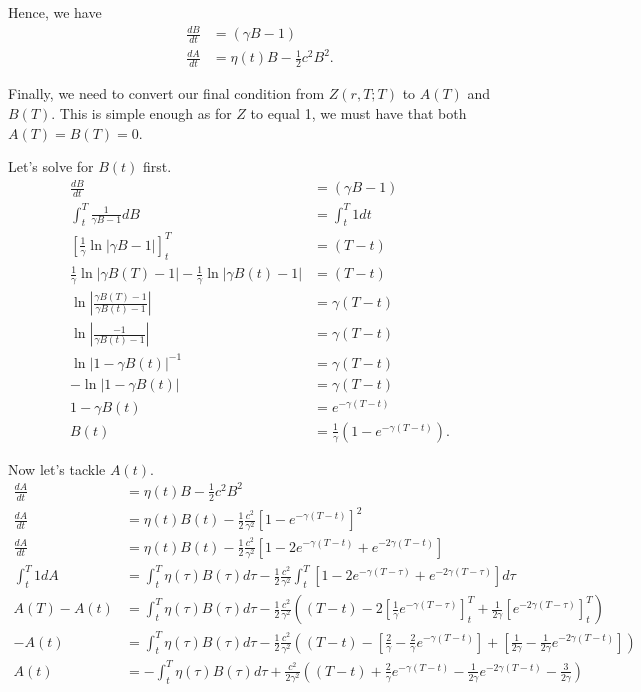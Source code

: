 \documentclass[11pt]{article}
\begin{document}
Hence, we have
\begin{align}
    \frac{dB}{dt} &= (\gamma B - 1) \\
    \frac{dA}{dt} &= \eta(t) B - \frac{1}{2} c^2 B^2.
\end{align}

Finally, we need to convert our final condition from $Z(r,T;T)$ to $A(T)$ and $B(T)$. This is simple enough as for $Z$ to equal 1, we must have that both $A(T) = B(T) = 0$.

Let's solve for $B(t)$ first.
\begin{align}
\frac{dB}{dt} &= (\gamma B - 1) \\[10pt]
\int_{t}^{T} \frac{1}{\gamma B - 1} dB &= \int_{t}^{T} 1 dt \\[10pt]
\left[ \frac{1}{\gamma} \ln |\gamma B - 1| \right]_{t}^{T} &= (T-t) \\[10pt]
\frac{1}{\gamma} \ln | \gamma B(T) - 1 | - \frac{1}{\gamma} \ln | \gamma B(t) - 1 | &= (T-t) \\[10pt]
\ln \left| \frac{\gamma B(T) - 1 }{\gamma B(t) -1}\right| &= \gamma (T-t) \\[10pt]
\ln \left| \frac{- 1 }{\gamma B(t) -1}\right| &= \gamma (T-t) \\[10pt]
\ln | 1 - \gamma B(t) |^{-1} &= \gamma (T-t) \\[10pt]
-\ln | 1 - \gamma B(t) | &= \gamma (T-t) \\[10pt]
1 - \gamma B(t) &= e^{-\gamma (T-t)} \\[10pt]
B(t) &= \frac{1}{\gamma} (1 - e^{-\gamma (T-t)}).
\end{align}

\newpage

Now let's tackle $A(t)$.
\begin{align}
    \frac{dA}{dt} &= \eta(t) B - \frac{1}{2} c^2 B^2\\[10pt]
    \frac{dA}{dt} &= \eta(t) B(t) - \frac{1}{2} \frac{c^2}{\gamma^2} \left[ 1 - e^{-\gamma(T-t)} \right]^2 \\[10pt]
    \frac{dA}{dt} &= \eta(t) B(t) - \frac{1}{2} \frac{c^2}{\gamma^2} \left[ 1 - 2e^{-\gamma(T-t)} + e^{-2 \gamma (T-t)} \right] \\[10pt]
    \int_{t}^{T} 1 dA &= \int_{t}^{T} \eta(\tau) B(\tau) d\tau - \frac{1}{2} \frac{c^2}{\gamma^2} \int_{t}^{T} \left[ 1 - 2e^{-\gamma(T-\tau)} + e^{-2 \gamma (T-\tau)} \right] d\tau \\[10pt]
    A(T) - A(t) &= \int_{t}^{T} \eta(\tau) B(\tau) d\tau - \frac{1}{2} \frac{c^2}{\gamma^2} \left( (T-t)  -2 \left[ \frac{1}{\gamma} e^{-\gamma (T-\tau)} \right]_{t}^{T} + \frac{1}{2\gamma} \left[ e^{-2\gamma (T-\tau)} \right]_{t}^{T} \right) \\[10pt]
    -A(t) &= \int_{t}^{T} \eta(\tau) B(\tau) d\tau - \frac{1}{2} \frac{c^2}{\gamma^2} \left( (T-t) - \left[ \frac{2}{\gamma} - \frac{2}{\gamma} e^{-\gamma(T-t)} \right] + \left[ \frac{1}{2\gamma} - \frac{1}{2\gamma} e^{-2\gamma (T-t)} \right] \right) \\[10pt]
    A(t) &= -\int_{t}^{T} \eta(\tau) B(\tau) d\tau + \frac{c^2}{2\gamma^2} \left( (T-t) + \frac{2}{\gamma} e^{-\gamma(T-t)} - \frac{1}{2\gamma} e^{-2\gamma (T-t)} - \frac{3}{2\gamma} \right) 
\end{align}
\end{document}
